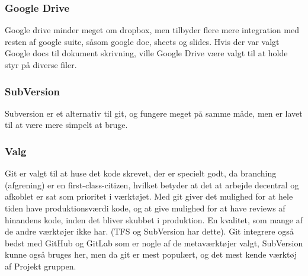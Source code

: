 \subsubsection{Google Drive}

Google drive minder meget om dropbox, men tilbyder flere mere integration med resten af google suite, såsom google doc, sheets og slides. Hvis der var valgt Google docs til dokument skrivning, ville Google Drive være valgt til at holde styr på diverse filer.

\subsubsection{SubVersion}

Subversion er et alternativ til git, og fungere meget på samme måde, men er lavet til at være mere simpelt at bruge.

\subsubsection{Valg}

Git er valgt til at huse det kode skrevet, der er specielt godt, da branching (afgrening) er en first-class-citizen, hvilket betyder at det at arbejde decentral og afkoblet er sat som prioritet i værktøjet. Med git giver det mulighed for at hele tiden have produktionsværdi kode, og at give mulighed for at have reviews af hinandens kode, inden det bliver skubbet i produktion. En kvalitet, som mange af de andre værktøjer ikke har. (TFS og SubVersion har dette). Git integrere også bedst med GitHub og GitLab som er nogle af de metaværktøjer valgt, SubVersion kunne også bruges her, men da git er mest populært, og det mest kende værktøj af Projekt gruppen.